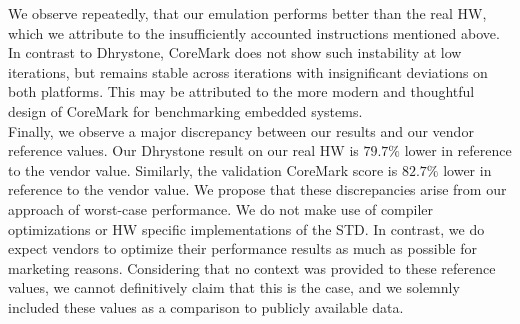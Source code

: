 \documentclass[english]{tudscrartcl}
\begin{document}
			We observe repeatedly, that our emulation performs better than the real \ac{HW}, which we attribute to the insufficiently accounted instructions mentioned above.
			In contrast to Dhrystone, CoreMark does not show such instability at low iterations, but remains stable across iterations with insignificant deviations on both platforms.
			This may be attributed to the more modern and thoughtful design of CoreMark for benchmarking embedded systems.
			\\
			Finally, we observe a major discrepancy between our results and our vendor reference values.
			Our Dhrystone result on our real \ac{HW} is $79.7\%$ lower in reference to the vendor value.
			Similarly, the validation CoreMark score is $82.7\%$ lower in reference to the vendor value.
			We propose that these discrepancies arise from our approach of worst-case performance.
			We do not make use of compiler optimizations or \ac{HW} specific implementations of the \acl{STD}.
			In contrast, we do expect vendors to optimize their performance results as much as possible for marketing reasons.
			Considering that no context was provided to these reference values, we cannot definitively claim that this is the case, and we solemnly included these values as a comparison to publicly available data.
			\\
\end{document}

